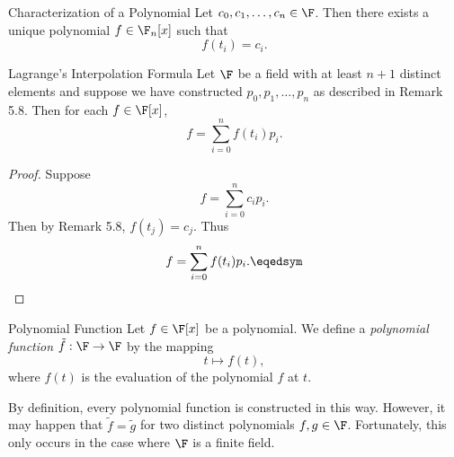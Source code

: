 \documentclass[linearalgebra]{subfiles}
\begin{document}
    \begin{cor}{Characterization of a Polynomial}
        Let $c_0, c_1, \ldots, c_n\in \F$. Then there exists a unique polynomial $f\in \F_n[x]$ such that
        \begin{equation*}
            f(t_i) = c_i.
        \end{equation*}
    \end{cor}	

    \begin{cor}{Lagrange's Interpolation Formula}
        Let $\F$ be a field with at least $n+1$ distinct elements and suppose we have constructed $p_0, p_1, \ldots, p_n$ as described in Remark 5.8. Then for each $f\in \F[x]$,
        \begin{equation*}
            f = \sum^{n}_{i=0} f(t_i)p_i.
        \end{equation*}
    \end{cor}	

    \begin{proof}
        Suppose
        \begin{equation*}
            f = \sum^{n}_{i=0} c_ip_i.
        \end{equation*}
        Then by Remark 5.8, $f\left( t_j \right) = c_j$. Thus
        \begin{equation*}
            f = \sum^{n}_{i=0} f(t_i)p_i. \eqedsym
        \end{equation*}
    \end{proof}

    \begin{definition}{Polynomial Function}{}
        Let $f\in \F[x]$ be a polynomial. We define a \emph{polynomial function} $\tilde{f}:\F\to\F$ by the mapping 
        \begin{equation*}
            t\mapsto f(t), 
        \end{equation*}
        where $f(t)$ is the evaluation of the polynomial $f$ at $t$.
    \end{definition}

    \begin{remark}
        By definition, every polynomial function is constructed in this way. However, it may happen that $\tilde{f}=\tilde{g}$ for two distinct polynomials $f,g\in \F$. Fortunately, this only occurs in the case where $\F$ is a finite field.
    \end{remark}
\end{document}
